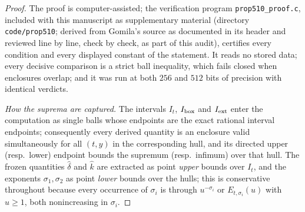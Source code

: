 \documentclass[11pt]{article}
\theoremstyle{definition}
\begin{document}
\begin{proof}
The proof is computer-assisted; the verification program
\texttt{prop510\_proof.c}, included with this manuscript as
supplementary material (directory \texttt{code/prop510}; derived
from Gomila's source as documented in its header and reviewed line
by line, check by check, as part of this audit), certifies every
condition and every displayed constant of the statement. It reads
no stored data; every decisive comparison is a strict ball
inequality, which fails closed when enclosures overlap; and it was
run at both $256$ and $512$ bits of precision with identical
verdicts.

\emph{How the suprema are captured.} The intervals $I_t$,
$I_{\rm box}$ and $I_{\rm ext}$ enter the computation as single
balls whose endpoints are the exact rational interval endpoints;
consequently every derived quantity is an enclosure valid
simultaneously for all $(t,y)$ in the corresponding hull, and its
directed upper (resp.\ lower) endpoint bounds the supremum (resp.\
infimum) over that hull. The frozen quantities $\widehat\delta$ and
$\widehat k$ are extracted as point \emph{upper} bounds over $I_t$,
and the exponents $\sigma_1,\sigma_2$ as point \emph{lower} bounds
over the hulls; this is conservative throughout because every
occurrence of $\sigma_i$ is through $u^{-\sigma_i}$ or
$E_{t,\sigma_i}(u)$ with $u\ge1$, both nonincreasing in $\sigma_i$.


\end{proof}
\end{document}
